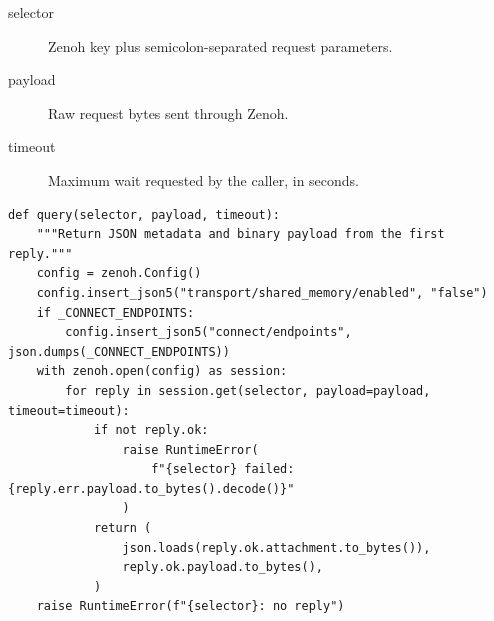 \documentclass[11pt,a4paper]{book}
\begin{document}
\begin{description}
\item[selector] Zenoh key plus semicolon-separated request parameters.
\item[payload] Raw request bytes sent through Zenoh.
\item[timeout] Maximum wait requested by the caller, in seconds.
\end{description}

\begin{lstlisting}[firstnumber=13]
def query(selector, payload, timeout):
    """Return JSON metadata and binary payload from the first reply."""
    config = zenoh.Config()
    config.insert_json5("transport/shared_memory/enabled", "false")
    if _CONNECT_ENDPOINTS:
        config.insert_json5("connect/endpoints", json.dumps(_CONNECT_ENDPOINTS))
    with zenoh.open(config) as session:
        for reply in session.get(selector, payload=payload, timeout=timeout):
            if not reply.ok:
                raise RuntimeError(
                    f"{selector} failed: {reply.err.payload.to_bytes().decode()}"
                )
            return (
                json.loads(reply.ok.attachment.to_bytes()),
                reply.ok.payload.to_bytes(),
            )
    raise RuntimeError(f"{selector}: no reply")
\end{lstlisting}
\end{document}
